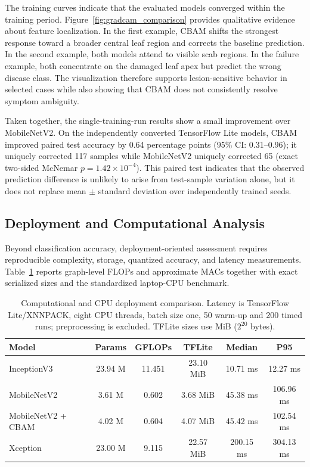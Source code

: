 The training curves indicate that the evaluated models converged within the training period. Figure~\ref{fig:gradcam_comparison} provides qualitative evidence about feature localization. In the first example, CBAM shifts the strongest response toward a broader central leaf region and corrects the baseline prediction. In the second example, both models attend to visible scab regions. In the failure example, both concentrate on the damaged leaf apex but predict the wrong disease class. The visualization therefore supports lesion-sensitive behavior in selected cases while also showing that CBAM does not consistently resolve symptom ambiguity.

Taken together, the single-training-run results show a small improvement over MobileNetV2. On the independently converted TensorFlow Lite models, CBAM improved paired test accuracy by 0.64 percentage points (95\% CI: 0.31--0.96); it uniquely corrected 117 samples while MobileNetV2 uniquely corrected 65 (exact two-sided McNemar $p=1.42\times10^{-4}$). This paired test indicates that the observed prediction difference is unlikely to arise from test-sample variation alone, but it does not replace mean $\pm$ standard deviation over independently trained seeds.

\subsection{Deployment and Computational Analysis}

Beyond classification accuracy, deployment-oriented assessment requires reproducible complexity, storage, quantized accuracy, and latency measurements. Table~\ref{tab:deployment_comparison} reports graph-level FLOPs and approximate MACs together with exact serialized sizes and the standardized laptop-CPU benchmark.

\begin{table}[H]
\caption{Computational and CPU deployment comparison. Latency is TensorFlow Lite/XNNPACK, eight CPU threads, batch size one, 50 warm-up and 200 timed runs; preprocessing is excluded. TFLite sizes use MiB ($2^{20}$ bytes).}
\label{tab:deployment_comparison}
\centering
\small
\begin{tabularx}{\textwidth}{l c c c c c}
\toprule
\textbf{Model} & \textbf{Params} & \textbf{GFLOPs} & \textbf{TFLite} & \textbf{Median} & \textbf{P95} \\
\midrule
InceptionV3 & 23.94 M & 11.451 & 23.10 MiB & 10.71 ms & 12.27 ms \\
MobileNetV2 & 3.61 M & 0.602 & 3.68 MiB & 45.38 ms & 106.96 ms \\
MobileNetV2 + CBAM & 4.02 M & 0.604 & 4.07 MiB & 45.42 ms & 102.54 ms \\
Xception & 23.00 M & 9.115 & 22.57 MiB & 200.15 ms & 304.13 ms \\
\bottomrule
\end{tabularx}
\normalsize
\end{table}


